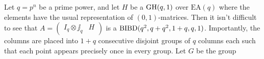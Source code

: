 \documentclass[../../../main]{subfiles}
\begin{document}
 \begin{ex}
  Let $q=p^n$ be a prime power, and let $H$ be a $\text{GH}(q,1)$ over $\text{EA}(q)$
  where the elements have the usual representation of $(0,1)$-matrices. Then it
  isn't difficult to see that $A=(\begin{smallmatrix} I_q \otimes \jj_q &
                                                                          H \end{smallmatrix})$
                                                                        is a
                                                                        $\text{BIBD}(q^2,q+q^2,1+q,q,1)$.
                                                                        Importantly,
                                                                        the
                                                                        columns
                                                                        are
                                                                        placed
                                                                        into
                                                                        $1+q$
                                                                        consecutive
                                                                        disjoint
                                                                        groups
                                                                        of $q$
                                                                        columns
                                                                        each
                                                                        such
                                                                        that
                                                                        each
                                                                        point
                                                                        appears
                                                                        precisely
                                                                        once in
                                                                        every
                                                                        group.
                                                                        Let $G$
                                                                        be the
                                                                        group

\end{ex}
\end{document}
